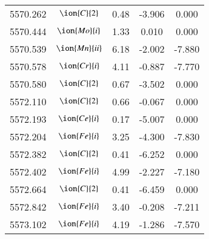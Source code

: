 \documentclass[fleqn,usenatbib]{mnras}
\begin{document}
\begin{center}
\begin{table}
\begin{tabular}{ccccc}
5570.262 &  $\ion{C}{2}$ & 0.48 & -3.906 & 0.000 \\ 
5570.444 &  $\ion{Mo}{i}$  & 1.33 & 0.010 & 0.000 \\ 
5570.539 &  $\ion{Mn}{ii}$  & 6.18 & -2.002 & -7.880 \\ 
5570.578 &  $\ion{Cr}{i}$  & 4.11 & -0.887 & -7.770 \\ 
5570.580 &  $\ion{C}{2}$ & 0.67 & -3.502 & 0.000 \\ 
5572.110 &  $\ion{C}{2}$ & 0.66 & -0.067 & 0.000 \\ 
5572.193 &  $\ion{Ce}{i}$  & 0.17 & -5.007 & 0.000 \\ 
5572.204 &  $\ion{Fe}{i}$  & 3.25 & -4.300 & -7.830 \\ 
5572.382 &  $\ion{C}{2}$ & 0.41 & -6.252 & 0.000 \\ 
5572.402 &  $\ion{Fe}{i}$  & 4.99 & -2.227 & -7.180 \\ 
5572.664 &  $\ion{C}{2}$ & 0.41 & -6.459 & 0.000 \\ 
5572.842 &  $\ion{Fe}{i}$  & 3.40 & -0.208 & -7.211 \\ 
5573.102 &  $\ion{Fe}{i}$  & 4.19 & -1.286 & -7.570 \\
 \end{tabular}
 \end{table}
 \end{center}
\end{document}
